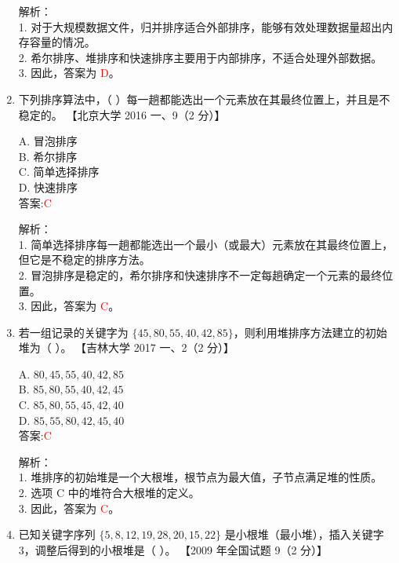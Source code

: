 \documentclass[lang=cn,newtx,10pt,scheme=chinese]{../../../elegantbook}
\begin{document}
\begin{enumerate}
    解析：\\
    1. 对于大规模数据文件，归并排序适合外部排序，能够有效处理数据量超出内存容量的情况。\\
    2. 希尔排序、堆排序和快速排序主要用于内部排序，不适合处理外部数据。\\
    3. 因此，答案为 \textcolor{red}{D}。\\

\item 下列排序算法中，（ ）每一趟都能选出一个元素放在其最终位置上，并且是不稳定的。  
    【北京大学 2016 一、9（2 分）】  

    A. 冒泡排序 \\  
    B. 希尔排序 \\  
    C. 简单选择排序 \\  
    D. 快速排序 \\  

    答案:\textcolor{red}{C}

    解析：\\
    1. 简单选择排序每一趟都能选出一个最小（或最大）元素放在其最终位置上，但它是不稳定的排序方法。\\
    2. 冒泡排序是稳定的，希尔排序和快速排序不一定每趟确定一个元素的最终位置。\\
    3. 因此，答案为 \textcolor{red}{C}。\\

\item 若一组记录的关键字为 $\{45, 80, 55, 40, 42, 85\}$，则利用堆排序方法建立的初始堆为（ ）。  
    【吉林大学 2017 一、2（2 分）】  

    A. $80, 45, 55, 40, 42, 85$ \\  
    B. $85, 80, 55, 40, 42, 45$ \\  
    C. $85, 80, 55, 45, 42, 40$ \\  
    D. $85, 55, 80, 42, 45, 40$ \\  

    答案:\textcolor{red}{C}

    解析：\\
    1. 堆排序的初始堆是一个大根堆，根节点为最大值，子节点满足堆的性质。\\
    2. 选项 C 中的堆符合大根堆的定义。\\
    3. 因此，答案为 \textcolor{red}{C}。\\

\item 已知关键字序列 $\{5, 8, 12, 19, 28, 20, 15, 22\}$ 是小根堆（最小堆），插入关键字 3，调整后得到的小根堆是（ ）。  
    【2009 年全国试题 9（2 分）】  


\end{enumerate}
\end{document}
